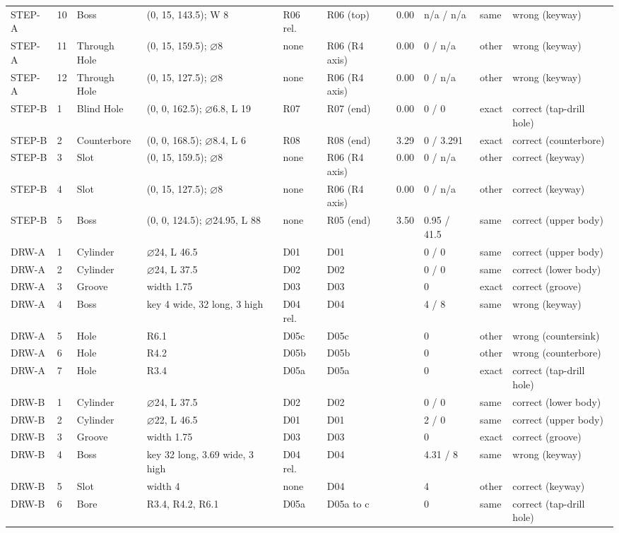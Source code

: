 \begin{table}[htbp]
{\begin{tabular}{p{0.85cm} p{0.3cm} p{1.45cm} p{2.9cm} p{0.9cm} p{1.35cm} p{0.55cm} p{1.15cm} p{0.7cm} p{2.0cm}}
STEP-A & 10 & Boss & (0, 15, 143.5); W 8 & R06 rel. & R06 (top) & 0.00 & n/a / n/a & same & wrong (keyway) \\
STEP-A & 11 & Through Hole & (0, 15, 159.5); $\varnothing$8 & none & R06 (R4 axis) & 0.00 & 0 / n/a & other & wrong (keyway) \\
STEP-A & 12 & Through Hole & (0, 15, 127.5); $\varnothing$8 & none & R06 (R4 axis) & 0.00 & 0 / n/a & other & wrong (keyway) \\
STEP-B & 1 & Blind Hole & (0, 0, 162.5); $\varnothing$6.8, L 19 & R07 & R07 (end) & 0.00 & 0 / 0 & exact & correct (tap-drill hole) \\
STEP-B & 2 & Counterbore & (0, 0, 168.5); $\varnothing$8.4, L 6 & R08 & R08 (end) & 3.29 & 0 / 3.291 & exact & correct (counterbore) \\
STEP-B & 3 & Slot & (0, 15, 159.5); $\varnothing$8 & none & R06 (R4 axis) & 0.00 & 0 / n/a & other & correct (keyway) \\
STEP-B & 4 & Slot & (0, 15, 127.5); $\varnothing$8 & none & R06 (R4 axis) & 0.00 & 0 / n/a & other & correct (keyway) \\
STEP-B & 5 & Boss & (0, 0, 124.5); $\varnothing$24.95, L 88 & none & R05 (end) & 3.50 & 0.95 / 41.5 & same & correct (upper body) \\
DRW-A & 1 & Cylinder & $\varnothing$24, L 46.5 & D01 & D01 &  & 0 / 0 & same & correct (upper body) \\
DRW-A & 2 & Cylinder & $\varnothing$24, L 37.5 & D02 & D02 &  & 0 / 0 & same & correct (lower body) \\
DRW-A & 3 & Groove & width 1.75 & D03 & D03 &  & 0 & exact & correct (groove) \\
DRW-A & 4 & Boss & key 4 wide, 32 long, 3 high & D04 rel. & D04 &  & 4 / 8 & same & wrong (keyway) \\
DRW-A & 5 & Hole & R6.1 & D05c & D05c &  & 0 & other & wrong (countersink) \\
DRW-A & 6 & Hole & R4.2 & D05b & D05b &  & 0 & other & wrong (counterbore) \\
DRW-A & 7 & Hole & R3.4 & D05a & D05a &  & 0 & exact & correct (tap-drill hole) \\
DRW-B & 1 & Cylinder & $\varnothing$24, L 37.5 & D02 & D02 &  & 0 / 0 & same & correct (lower body) \\
DRW-B & 2 & Cylinder & $\varnothing$22, L 46.5 & D01 & D01 &  & 2 / 0 & same & correct (upper body) \\
DRW-B & 3 & Groove & width 1.75 & D03 & D03 &  & 0 & exact & correct (groove) \\
DRW-B & 4 & Boss & key 32 long, 3.69 wide, 3 high & D04 rel. & D04 &  & 4.31 / 8 & same & wrong (keyway) \\
DRW-B & 5 & Slot & width 4 & none & D04 &  & 4 & other & correct (keyway) \\
DRW-B & 6 & Bore & R3.4, R4.2, R6.1 & D05a & D05a to c &  & 0 & same & correct (tap-drill hole) \\
\bottomrule
\end{tabular}}
\end{table}

